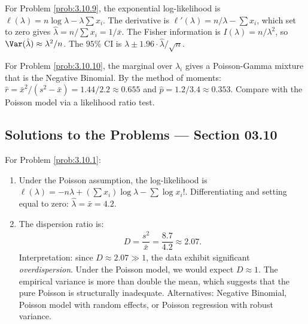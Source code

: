 \begin{sugerencia}
	\label{sug:3.10.9}
	For Problem \ref{prob:3.10.9}, the exponential log-likelihood is $\ell(\lambda) = n\log \lambda - \lambda \sum x_{i}$. The derivative is $\ell'(\lambda) = n/\lambda - \sum x_{i}$, which set to zero gives $\hat{\lambda} = n/\sum x_{i} = 1/\bar{x}$. The Fisher information is $I(\lambda) = n/\lambda^{2}$, so $\Var(\hat{\lambda}) \approx \lambda^{2}/n$. The $95\%$ CI is $\hat{\lambda} \pm 1.96 \cdot \hat{\lambda}/\sqrt{n}$.
\end{sugerencia}

\begin{sugerencia}
	\label{sug:3.10.10}
	For Problem \ref{prob:3.10.10}, the marginal over $\lambda_{i}$ gives a Poisson-Gamma mixture that is the Negative Binomial. By the method of moments: $\hat{r} = \bar{x}^{2}/(s^{2} - \bar{x}) = 1.44/2.2 \approx 0.655$ and $\hat{p} = 1.2/3.4 \approx 0.353$. Compare with the Poisson model via a likelihood ratio test.
\end{sugerencia}

\subsection*{Solutions to the Problems --- Section 03.10}

\begin{solucion}
	\label{sol:3.10.1}
	For Problem \ref{prob:3.10.1}:
	\begin{enumerate}
		\item Under the Poisson assumption, the log-likelihood is $\ell(\lambda) = -n\lambda + (\sum x_{i})\log \lambda - \sum \log x_{i}!$. Differentiating and setting equal to zero: $\hat{\lambda} = \bar{x} = 4.2$.
		\item The dispersion ratio is:
		\begin{align*}
			D = \dfrac{s^{2}}{\bar{x}} = \dfrac{8.7}{4.2} \approx 2.07.
		\end{align*}
		Interpretation: since $D \approx 2.07 \gg 1$, the data exhibit significant \emph{overdispersion}. Under the Poisson model, we would expect $D \approx 1$. The empirical variance is more than double the mean, which suggests that the pure Poisson is structurally inadequate. Alternatives: Negative Binomial, Poisson model with random effects, or Poisson regression with robust variance.
	\end{enumerate}
\end{solucion}

